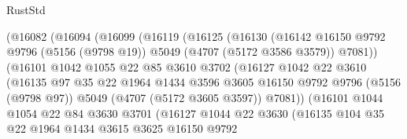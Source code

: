 \begin{lexlean}{RustStd}
\begin{coremodule}
                      (@16082
                        (@16094
                          (@16099
                            (@16119
                              (@16125
                                (@16130
                                  (@16142
                                    @16150
                                    @9792
                                    @9796
                                    (@5156 (@9798 @19))
                                    @5049
                                    (@4707 (@5172 @3586 @3579))
                                    @7081))
                                (@16101
                                  @1042
                                  @1055
                                  @22
                                  @85
                                  @3610
                                  @3702
                                  (@16127
                                    @1042
                                    @22
                                    @3610
                                    (@16135
                                      @97
                                      @35
                                      @22
                                      @1964
                                      @1434
                                      @3596
                                      @3605
                                      @16150
                                      @9792
                                      @9796
                                      (@5156 (@9798 @97))
                                      @5049
                                      (@4707 (@5172 @3605 @3597))
                                      @7081))
                                  (@16101
                                    @1044
                                    @1054
                                    @22
                                    @84
                                    @3630
                                    @3701
                                    (@16127
                                      @1044
                                      @22
                                      @3630
                                      (@16135
                                        @104
                                        @35
                                        @22
                                        @1964
                                        @1434
                                        @3615
                                        @3625
                                        @16150
                                        @9792

\end{coremodule}
\end{lexlean}
